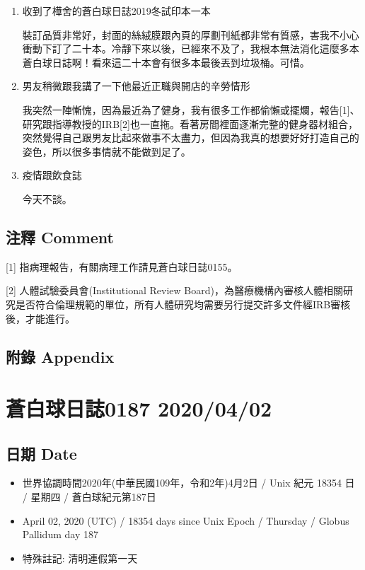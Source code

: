 \documentclass[a5paper, 12pt
]{book}
\providecommand{\tightlist}{%
  \setlength{\itemsep}{0pt}\setlength{\parskip}{0pt}}
\begin{document}
\begin{enumerate}
\def\labelenumi{\arabic{enumi}.}
\item
  收到了樺舍的蒼白球日誌2019冬試印本一本

  裝訂品質非常好，封面的絲絨膜跟內頁的厚劃刊紙都非常有質感，害我不小心衝動下訂了二十本。冷靜下來以後，已經來不及了，我根本無法消化這麼多本蒼白球日誌啊！看來這二十本會有很多本最後丟到垃圾桶。可惜。
\item
  男友稍微跟我講了一下他最近正職與開店的辛勞情形

  我突然一陣慚愧，因為最近為了健身，我有很多工作都偷懶或擺爛，報告{[}1{]}、研究跟指導教授的IRB{[}2{]}也一直拖。看著房間裡面逐漸完整的健身器材組合，突然覺得自己跟男友比起來做事不太盡力，但因為我真的想要好好打造自己的姿色，所以很多事情就不能做到足了。
\item
  疫情跟飲食誌

  今天不談。
\end{enumerate}

\hypertarget{ux6ce8ux91cb-comment-31}{%
\subsection{注釋 Comment}\label{ux6ce8ux91cb-comment-31}}

{[}1{]} 指病理報告，有關病理工作請見蒼白球日誌0155。

{[}2{]} 人體試驗委員會(Institutional Review
Board)，為醫療機構內審核人體相關研究是否符合倫理規範的單位，所有人體研究均需要另行提交許多文件經IRB審核後，才能進行。

\hypertarget{ux9644ux9304-appendix-31}{%
\subsection{附錄 Appendix}\label{ux9644ux9304-appendix-31}}

\hypertarget{ux84bcux767dux7403ux65e5ux8a8c0187-20200402}{%
\section{蒼白球日誌0187
2020/04/02}\label{ux84bcux767dux7403ux65e5ux8a8c0187-20200402}}

\hypertarget{ux65e5ux671f-date-32}{%
\subsection{日期 Date}\label{ux65e5ux671f-date-32}}

\begin{itemize}
\tightlist
\item
  世界協調時間2020年(中華民國109年，令和2年)4月2日 / Unix 紀元 18354 日
  / 星期四 / 蒼白球紀元第187日
\item
  April 02, 2020 (UTC) / 18354 days since Unix Epoch / Thursday / Globus
  Pallidum day 187
\item
  特殊註記: 清明連假第一天
\end{itemize}
\end{document}
